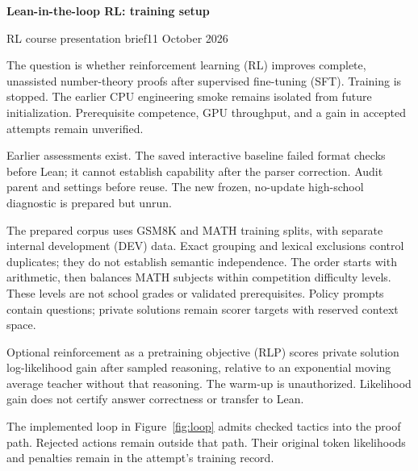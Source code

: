 \documentclass[11pt]{article}
\newcommand{\heading}[1]{\vspace{4pt}{\large\bfseries #1}\par}
\begin{document}
{\LARGE\bfseries Lean-in-the-loop RL: training setup}\par
{\large RL course presentation brief}\hfill 11 October 2026\par

The question is whether reinforcement learning (RL) improves complete, unassisted number-theory proofs after supervised fine-tuning (SFT).
Training is stopped. The earlier CPU engineering smoke remains isolated from future initialization.
Prerequisite competence, GPU throughput, and a gain in accepted attempts remain unverified.

\heading{1. Reuse assessments; prepare prerequisites}
Earlier assessments exist. The saved interactive baseline failed format checks before Lean; it cannot establish capability after the parser correction.
Audit parent and settings before reuse.
The new frozen, no-update high-school diagnostic is prepared but unrun.

The prepared corpus uses GSM8K and MATH training splits, with separate internal development (DEV) data.
Exact grouping and lexical exclusions control duplicates; they do not establish semantic independence.
The order starts with arithmetic, then balances MATH subjects within competition difficulty levels.
These levels are not school grades or validated prerequisites.
Policy prompts contain questions; private solutions remain scorer targets with reserved context space.

Optional reinforcement as a pretraining objective (RLP) scores private solution log-likelihood gain after sampled reasoning, relative to an exponential moving average teacher without that reasoning.
The warm-up is unauthorized.
Likelihood gain does not certify answer correctness or transfer to Lean.

\heading{2. Separate a proof path from an attempt's training record}
The implemented loop in Figure~\ref{fig:loop} admits checked tactics into the proof path.
Rejected actions remain outside that path.
Their original token likelihoods and penalties remain in the attempt's training record.
\end{document}
